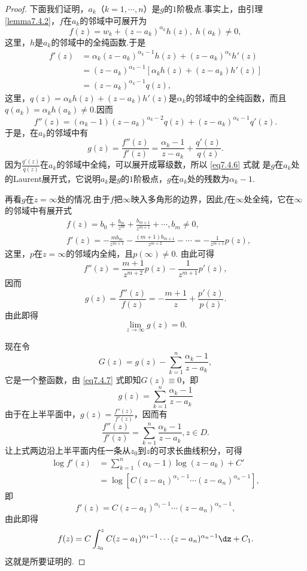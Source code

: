 \begin{proof}
下面我们证明，$a_k$（$k=1,\cdots,n$）是$g$的$1$阶极点.事实上，由引理 \ref{lemma7.4.2}，$f$在$a_k$的邻域中可展开为
\[f(z)=w_k+(z-a_k)^{\alpha_k}h(z),\;h(a_k)\ne0,\]
这里，$h$是$a_k$的邻域中的全纯函数.于是
\begin{align*}
f'(z)&=\alpha_k(z-a_k)^{\alpha_k-1}h(z)+(z-a_k)^{\alpha_k}h'(z)\\
&=(z-a_k)^{\alpha_k-1}[\alpha_kh(z)+(z-a_k)h'(z)]\\
&=(z-a_k)^{\alpha_k-1}q(z),
\end{align*}
这里，$q(z)=\alpha_kh(z)+(z-a_k)h'(z)$是$\alpha_k$的邻域中的全纯函数，而且$q(a_k)=\alpha_kh(a_k)\ne0$.因而
\[f''(z)=(\alpha_k-1)(z-a_k)^{\alpha_k-2}q(z)+(z-a_k)^{\alpha_k-1}q'(z).\]
于是，在$a_k$的邻域中有
\begin{equation}\label{eq7.4.6}
g(z)=\frac{f''(z)}{f'(z)}=\frac{\alpha_k-1}{z-a_k}+\frac{q'(z)}{q(z)}.
\end{equation}
因为$\frac{q'(z)}{q(z)}$在$a_k$的邻域中全纯，可以展开成幂级数，所以 \eqref{eq7.4.6} 式就
是$g$在$a_k$处的Laurent展开式，它说明$a_k$是$g$的$1$阶极点，$g$在$a_k$处的残数为$\alpha_k-1$.

再看$g$在$z=\infty$处的情况.由于$f$把$\infty$映入多角形的边界，因此$f$在$\infty$处全纯，它在$\infty$的邻域中有展开式
\begin{align*}
&f(z)=b_0+\frac{b_m}{z^m}+\frac{b_{m+1}}{z^{m+1}}+\cdots,b_m\ne0,\\
&f'(z)=-\frac{mb_m}{z^{m+1}}-\frac{(m+1)b_{m+1}}{z^{m+2}}-\cdots=-\frac1{z^{m+1}}p(z),
\end{align*}
这里，$p$在$z=\infty$的邻域内全纯，且$p(\infty)\ne0$. 由此可得
\[f''(z)=\frac{m+1}{z^{m+2}}p(z)-\frac1{z^{m+1}}p'(z),\]
因而
\[g(z)=\frac{f''(z)}{f(z)}=-\frac{m+1}z+\frac{p'(z)}{p(z)}.\]
由此即得
\begin{equation}\label{eq7.4.7}
\lim_{z\to\infty}g(z)=0.
\end{equation}

现在令
\[G(z)=g(z)-\sum_{k=1}^n\frac{\alpha_k-1}{z-a_k},\]
它是一个整函数，由 \eqref{eq7.4.7} 式即知$G(z)\equiv0$，即
\[g(z)=\sum_{k=1}^n\frac{\alpha_k-1}{z-a_k}\]
由于在上半平面中，$g(z)=\frac{f''(z)}{f'(z)}$，因而有
\[\frac{f''(z)}{f'(z)}=\sum_{k=1}^n\frac{\alpha_k-1}{z-a_k},z\in D.\]
让上式两边沿上半平面内任一条从$z_0$到$z$的可求长曲线积分，可得
\begin{align*}
\log f'(z)&=\sum_{k=1}^n(\alpha_k-1)\log(z-a_k)+C'\\
&=\log[C(z-a_1)^{\alpha_1-1}\cdots(z-a_n)^{\alpha_n-1}],
\end{align*}
即
\[f'(z)=C(z-a_1)^{\alpha_1-1}\cdots(z-a_n)^{\alpha_n-1},\]
由此即得
\[f(z)=C\int_{z_0}^zC(z-a_1)^{\alpha_1-1}\cdots(z-a_n)^{\alpha_n-1}\dz+C_1.\]
这就是所要证明的.
\end{proof}

